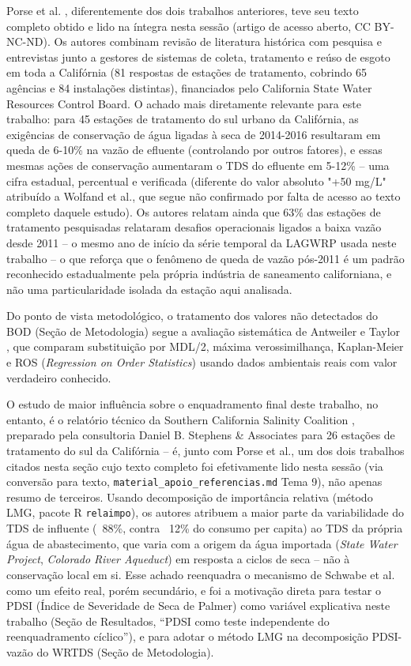 Porse et al. \cite{porse2023adapting}, diferentemente dos dois trabalhos anteriores, teve seu texto completo obtido e lido na íntegra nesta sessão (artigo de acesso aberto, CC BY-NC-ND). Os autores combinam revisão de literatura histórica com pesquisa e entrevistas junto a gestores de sistemas de coleta, tratamento e reúso de esgoto em toda a Califórnia (81 respostas de estações de tratamento, cobrindo 65 agências e 84 instalações distintas), financiados pelo California State Water Resources Control Board. O achado mais diretamente relevante para este trabalho: para 45 estações de tratamento do sul urbano da Califórnia, as exigências de conservação de água ligadas à seca de 2014-2016 resultaram em queda de 6-10\% na vazão de efluente (controlando por outros fatores), e essas mesmas ações de conservação aumentaram o TDS do efluente em 5-12\% -- uma cifra estadual, percentual e verificada (diferente do valor absoluto "+50 mg/L" atribuído a Wolfand et al., que segue não confirmado por falta de acesso ao texto completo daquele estudo). Os autores relatam ainda que 63\% das estações de tratamento pesquisadas relataram desafios operacionais ligados a baixa vazão desde 2011 -- o mesmo ano de início da série temporal da LAGWRP usada neste trabalho -- o que reforça que o fenômeno de queda de vazão pós-2011 é um padrão reconhecido estadualmente pela própria indústria de saneamento californiana, e não uma particularidade isolada da estação aqui analisada.

Do ponto de vista metodológico, o tratamento dos valores não detectados do BOD (Seção de Metodologia) segue a avaliação sistemática de Antweiler e Taylor \cite{antweiler2008evaluation}, que comparam substituição por MDL/2, máxima verossimilhança, Kaplan-Meier e ROS (\textit{Regression on Order Statistics}) usando dados ambientais reais com valor verdadeiro conhecido.

O estudo de maior influência sobre o enquadramento final deste trabalho, no entanto, é o relatório técnico da Southern California Salinity Coalition \cite{scsc2018tds}, preparado pela consultoria Daniel B. Stephens \& Associates para 26 estações de tratamento do sul da Califórnia -- é, junto com Porse et al., um dos dois trabalhos citados nesta seção cujo texto completo foi efetivamente lido nesta sessão (via conversão para texto, \texttt{material\_apoio\_referencias.md} Tema 9), não apenas resumo de terceiros. Usando decomposição de importância relativa (método LMG, pacote R \texttt{relaimpo}), os autores atribuem a maior parte da variabilidade do TDS de influente (~88\%, contra ~12\% do consumo per capita) ao TDS da própria água de abastecimento, que varia com a origem da água importada (\textit{State Water Project}, \textit{Colorado River Aqueduct}) em resposta a ciclos de seca -- não à conservação local em si. Esse achado reenquadra o mecanismo de Schwabe et al.\ \cite{schwabe2020unintended} como um efeito real, porém secundário, e foi a motivação direta para testar o PDSI (Índice de Severidade de Seca de Palmer) como variável explicativa neste trabalho (Seção de Resultados, ``PDSI como teste independente do reenquadramento cíclico''), e para adotar o método LMG na decomposição PDSI-vazão do WRTDS (Seção de Metodologia).
